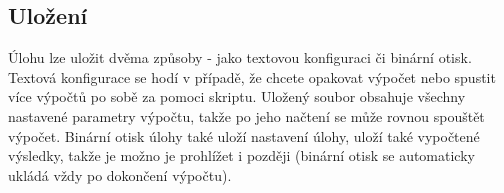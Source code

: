 \documentclass[a4paper,12pt]{article}
\begin{document}
\subsection{Uložení}
\begin{figure}[H]
\end{figure}
Úlohu lze uložit dvěma způsoby - jako textovou konfiguraci či binární otisk. Textová konfigurace se hodí v případě, že chcete opakovat výpočet nebo spustit více výpočtů po sobě za pomoci skriptu. Uložený soubor obsahuje všechny nastavené parametry výpočtu, takže po jeho načtení se může rovnou spouštět výpočet. Binární otisk úlohy také uloží nastavení úlohy, uloží také vypočtené výsledky, takže je možno je prohlížet i později (binární otisk se automaticky ukládá vždy po dokončení výpočtu).
\end{document}
